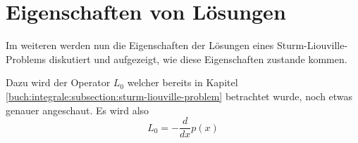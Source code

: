 %
%
%
\section{Eigenschaften von Lösungen
\label{sturmliouville:section:solution-properties}}

Im weiteren werden nun die Eigenschaften der Lösungen eines
Sturm-Liouville-Problems diskutiert und aufgezeigt, wie diese Eigenschaften
zustande kommen.

Dazu wird der Operator $L_0$ welcher bereits in Kapitel
\ref{buch:integrale:subsection:sturm-liouville-problem} betrachtet wurde,
noch etwas genauer angeschaut. Es wird also
\[
    L_0
    =
    -\frac{d}{dx}p(x)
\]